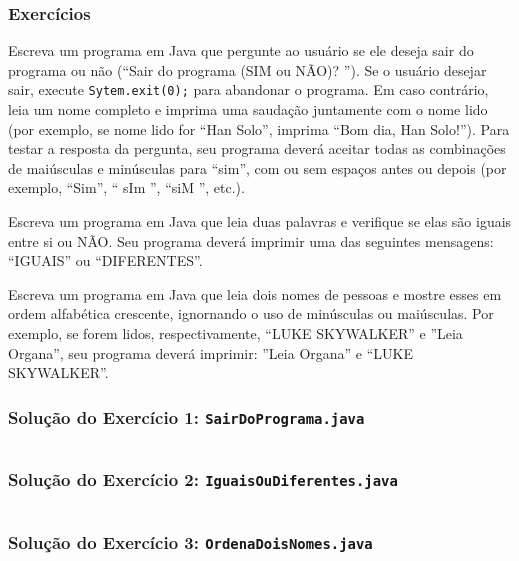 \documentclass[xcolor={dvipsnames,table},aspectratio=169]{beamer}
\begin{document}
\begin{frame}\frametitle{Exercícios}
\begin{enumerate}
{\small
	\item Escreva um programa em Java que pergunte ao usuário se ele deseja sair do programa ou não (``Sair do programa (SIM ou NÃO)? ''). Se o usuário desejar sair, execute \texttt{Sytem.exit(0);} para abandonar o programa. Em caso contrário, leia um nome completo e imprima uma saudação juntamente com o nome lido (por exemplo, se nome lido for ``Han Solo'', imprima ``Bom dia, Han Solo!''). Para testar a resposta da pergunta, seu programa deverá aceitar todas as combinações de maiúsculas e minúsculas para ``sim'', com ou sem espaços antes ou depois (por exemplo, ``Sim'', ``  sIm '', ``siM '', etc.).\\
	\item Escreva um programa em Java que leia duas palavras e verifique se elas são iguais entre si ou NÃO. Seu programa deverá imprimir uma das seguintes mensagens: ``IGUAIS'' ou ``DIFERENTES''.\\
	\item Escreva um programa em Java que leia dois nomes de pessoas e mostre esses em ordem alfabética crescente, ignornando o uso de minúsculas ou maiúsculas. Por exemplo, se forem lidos, respectivamente, ``LUKE SKYWALKER'' e ''Leia Organa'', seu programa deverá imprimir: ''Leia Organa'' e ``LUKE SKYWALKER''.\\
}
\end{enumerate}
\end{frame}

\begin{frame}\frametitle{Solução do Exercício 1: \texttt{SairDoPrograma.java}}
	\scriptsize{\inputminted[bgcolor=cyan!10]{java}{src/SairDoPrograma.java}}
\end{frame}

\begin{frame}\frametitle{Solução do Exercício 2: \texttt{IguaisOuDiferentes.java}}
	\scriptsize{\inputminted[bgcolor=cyan!10]{java}{src/IguaisOuDiferentes.java}}
\end{frame}

\begin{frame}\frametitle{Solução do Exercício 3: \texttt{OrdenaDoisNomes.java}}
	\scriptsize{\inputminted[bgcolor=cyan!10]{java}{src/OrdenaDoisNomes.java}}
\end{frame}
\end{document}
